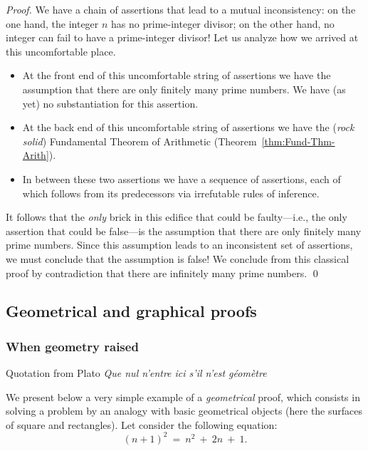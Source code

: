 \begin{proof}
We have a chain of assertions that lead to a mutual inconsistency: on
the one hand, the integer $n$ has no prime-integer divisor; on the
other hand, no integer can fail to have a prime-integer divisor!  Let
us analyze how we arrived at this uncomfortable place.
\begin{itemize}
\item
At the front end of this uncomfortable string of assertions we have
the assumption that there are only finitely many prime numbers.  We
have (as yet) no substantiation for this assertion.
\item
At the back end of this uncomfortable string of assertions we have
the ({\em rock solid}) Fundamental Theorem of Arithmetic
(Theorem~\ref{thm:Fund-Thm-Arith}).
\item
In between these two assertions we have a sequence of assertions, each
of which follows from its predecessors via irrefutable rules of
inference.
\end{itemize}
It follows that the {\em only} brick in this edifice that could be
faulty---i.e., the only assertion that could be false---is the
assumption that there are only finitely many prime numbers.  Since
this assumption leads to an inconsistent set of assertions, we must
conclude that the assumption is false!  We conclude from this
classical proof by contradiction that there are infinitely many prime
numbers.  \qed
\end{proof}



\subsection{Geometrical and graphical proofs}
\label{sec:unconventionalproofs}

\subsubsection{When geometry raised}

Quotation from Plato
\textit{Que nul n'entre ici s'il n'est g\'eom\`etre}
\medskip

We present below a very simple example of a \textit{geometrical} proof, 
which consists in solving a problem by an analogy with basic geometrical objects
(here the surfaces of square and rectangles). 
Let consider the following equation:
\begin{equation}
(n+1)^2 \ = \ n^2 \ + \ 2n \ + \ 1.
\end{equation}

